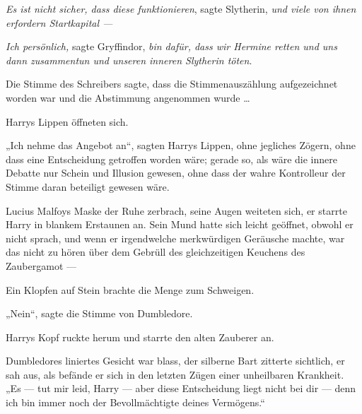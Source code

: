 \emph{Es ist nicht sicher, dass diese funktionieren}, sagte Slytherin, \emph{und viele von ihnen erfordern Startkapital —}

\emph{Ich persönlich,} sagte Gryffindor, \emph{bin dafür, dass wir Hermine retten und uns dann zusammentun und unseren inneren Slytherin töten}.

Die Stimme des Schreibers sagte, dass die Stimmenauszählung aufgezeichnet worden war und die Abstimmung angenommen wurde …

Harrys Lippen öffneten sich.

„Ich nehme das Angebot an“, sagten Harrys Lippen, ohne jegliches Zögern, ohne dass eine Entscheidung getroffen worden wäre; gerade so, als wäre die innere Debatte nur Schein und Illusion gewesen, ohne dass der wahre Kontrolleur der Stimme daran beteiligt gewesen wäre.

Lucius Malfoys Maske der Ruhe zerbrach, seine Augen weiteten sich, er starrte Harry in blankem Erstaunen an. Sein Mund hatte sich leicht geöffnet, obwohl er nicht sprach, und wenn er irgendwelche merkwürdigen Geräusche machte, war das nicht zu hören über dem Gebrüll des gleichzeitigen Keuchens des Zaubergamot —

Ein Klopfen auf Stein brachte die Menge zum Schweigen.

„Nein“, sagte die Stimme von Dumbledore.

Harrys Kopf ruckte herum und starrte den alten Zauberer an.

Dumbledores liniertes Gesicht war blass, der silberne Bart zitterte sichtlich, er sah aus, als befände er sich in den letzten Zügen einer unheilbaren Krankheit.
„Es — tut mir leid, Harry — aber diese Entscheidung liegt nicht bei dir — denn ich bin immer noch der Bevollmächtigte deines Vermögens.“

